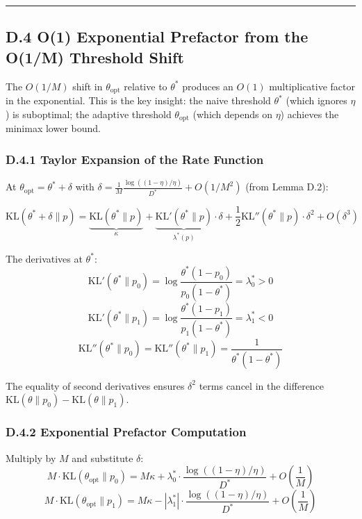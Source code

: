 \documentclass[
  12pt,
]{article}
\begin{document}
\begin{center}\rule{0.5\linewidth}{0.5pt}\end{center}

\subsection{D.4 O(1) Exponential Prefactor from the O(1/M) Threshold
Shift}\label{d.4-o1-exponential-prefactor-from-the-o1m-threshold-shift}

The \(O(1/M)\) shift in \(\theta_{\text{opt}}\) relative to \(\theta^*\)
produces an \(O(1)\) multiplicative factor in the exponential. This is
the key insight: the naive threshold \(\theta^*\) (which ignores
\(\eta\)) is suboptimal; the adaptive threshold \(\theta_{\text{opt}}\)
(which depends on \(\eta\)) achieves the minimax lower bound.

\subsubsection{D.4.1 Taylor Expansion of the Rate
Function}\label{d.4.1-taylor-expansion-of-the-rate-function}

At \(\theta_{\text{opt}} = \theta^* + \delta\) with
\(\delta = \frac{1}{M}\frac{\log((1-\eta)/\eta)}{D^*} + O(1/M^2)\) (from
Lemma D.2):

\[\text{KL}(\theta^* + \delta \| p) = \underbrace{\text{KL}(\theta^* \| p)}_{\kappa} + \underbrace{\text{KL}'(\theta^* \| p)}_{\lambda^*(p)} \cdot \delta + \frac{1}{2}\text{KL}''(\theta^* \| p) \cdot \delta^2 + O(\delta^3)\]

The derivatives at \(\theta^*\):
\[\text{KL}'(\theta^* \| p_0) = \log\frac{\theta^*(1-p_0)}{p_0(1-\theta^*)} = \lambda_0^* > 0\]
\[\text{KL}'(\theta^* \| p_1) = \log\frac{\theta^*(1-p_1)}{p_1(1-\theta^*)} = \lambda_1^* < 0\]
\[\text{KL}''(\theta^* \| p_0) = \text{KL}''(\theta^* \| p_1) = \frac{1}{\theta^*(1-\theta^*)}\]

The equality of second derivatives ensures \(\delta^2\) terms cancel in
the difference \(\text{KL}(\theta\|p_0) - \text{KL}(\theta\|p_1)\).

\subsubsection{D.4.2 Exponential Prefactor
Computation}\label{d.4.2-exponential-prefactor-computation}

Multiply by \(M\) and substitute \(\delta\):
\[M \cdot \text{KL}(\theta_{\text{opt}} \| p_0) = M\kappa + \lambda_0^* \cdot \frac{\log((1-\eta)/\eta)}{D^*} + O\left(\frac{1}{M}\right)\]
\[M \cdot \text{KL}(\theta_{\text{opt}} \| p_1) = M\kappa - |\lambda_1^*| \cdot \frac{\log((1-\eta)/\eta)}{D^*} + O\left(\frac{1}{M}\right)\]
\end{document}

